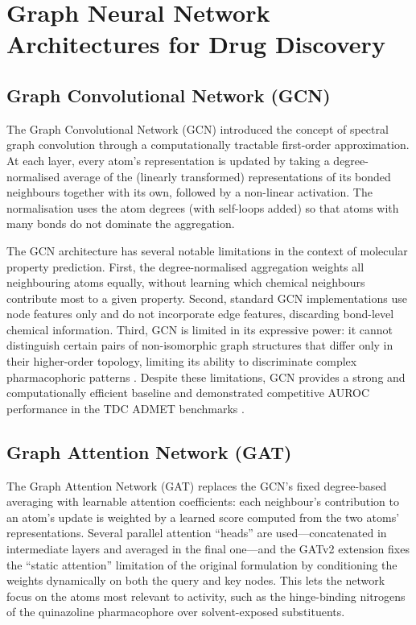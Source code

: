 \section{Graph Neural Network Architectures for Drug Discovery}
\label{sec:gnn_arch}

\subsection{Graph Convolutional Network (GCN)}

The Graph Convolutional Network (GCN) \parencite{kipf2017gcn} introduced the
concept of spectral graph convolution through a computationally tractable
first-order approximation. At each layer, every atom's representation is updated by
taking a degree-normalised average of the (linearly transformed) representations of
its bonded neighbours together with its own, followed by a non-linear activation.
The normalisation uses the atom degrees (with self-loops added) so that atoms with
many bonds do not dominate the aggregation.

The GCN architecture has several notable limitations in the context of molecular
property prediction. First, the degree-normalised aggregation weights all
neighbouring atoms equally, without learning which chemical neighbours contribute
most to a given property. Second, standard GCN implementations use node features
only and do not incorporate edge features, discarding bond-level chemical
information. Third, GCN is limited in its expressive power: it cannot distinguish
certain pairs of non-isomorphic graph structures that differ only in their
higher-order topology, limiting its ability to discriminate complex pharmacophoric
patterns \parencite{xu2019gin}. Despite these limitations, GCN provides a strong
and computationally efficient baseline and demonstrated competitive AUROC
performance in the TDC ADMET benchmarks \parencite{huang2021therapeutics}.

\subsection{Graph Attention Network (GAT)}

The Graph Attention Network (GAT) \parencite{velickovic2018gat} replaces the GCN's
fixed degree-based averaging with learnable attention coefficients: each neighbour's
contribution to an atom's update is weighted by a learned score computed from the two
atoms' representations. Several parallel attention ``heads'' are used---concatenated
in intermediate layers and averaged in the final one---and the GATv2 extension
\parencite{brody2022attentive} fixes the ``static attention'' limitation of the
original formulation by conditioning the weights dynamically on both the query and key
nodes. This lets the network focus on the atoms most relevant to activity, such as the
hinge-binding nitrogens of the quinazoline pharmacophore over solvent-exposed
substituents.

